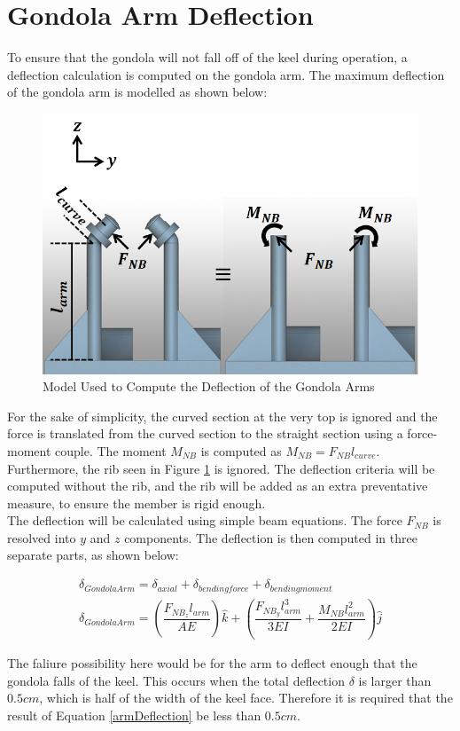 \documentclass[../main.tex]{subfiles}
\begin{document}
\section{Gondola Arm Deflection}
To ensure that the gondola will not fall off of the keel during operation, a deflection calculation is computed on the gondola arm. The maximum deflection of the gondola arm is modelled as shown below:

\begin{figure}[H]
	\centering
	\includegraphics[width=.8\linewidth]{img/gondola/armDeflection.PNG}
	\caption{Model Used to Compute the Deflection of the Gondola Arms}
	\label{fig:deflection}
\end{figure}

For the sake of simplicity, the curved section at the very top is ignored and the force is translated from the curved section to the straight section using a force-moment couple. The moment $M_{NB}$ is computed as $M_{NB}=F_{NB}l_{curve}$. Furthermore, the rib seen in Figure \ref{fig:deflection} is ignored. The deflection criteria will be computed without the rib, and the rib will be added as an extra preventative measure, to ensure the member is rigid enough.\\

The deflection will be calculated using simple beam equations. The force $F_{NB}$ is resolved into $y$ and $z$ components. The deflection is then computed in three separate parts, as shown below:

\begin{align}
	\delta _{Gondola Arm} = \delta _{axial} + \delta _{bending force} + \delta _{bending moment} \\ \label{armDeflection}
	\delta _{Gondola Arm}  = \left(\dfrac{F_{NB_{z}}l_{arm}}{AE}\right)\hat{k} + \left(\dfrac{F_{NB_{y}}l_{arm}^3}{3EI}  + \dfrac{M_{NB}l_{arm}^2}{2EI} \right) \hat{j}
\end{align}

The faliure possibility here would be for the arm to deflect enough that the gondola falls of the keel. This occurs when the total deflection $\delta$ is larger than $0.5cm$, which is half of the width of the keel face. Therefore it is required that the result of Equation \ref{armDeflection} be less than $0.5cm$.
\end{document}
